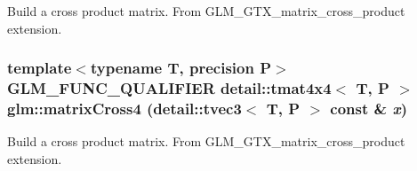 Build a cross product matrix. From GLM\_\-GTX\_\-matrix\_\-cross\_\-product extension. \hypertarget{group__gtx__matrix__cross__product_g9fae5322a4e4afe9742157f22b505635}{
\subsubsection[matrixCross4]{\setlength{\rightskip}{0pt plus 5cm}template$<$typename T, precision P$>$ GLM\_\-FUNC\_\-QUALIFIER detail::tmat4x4$<$ T, P $>$ glm::matrixCross4 (detail::tvec3$<$ T, P $>$ const \& {\em x})}}
\label{group__gtx__matrix__cross__product_g9fae5322a4e4afe9742157f22b505635}


Build a cross product matrix. From GLM\_\-GTX\_\-matrix\_\-cross\_\-product extension. 